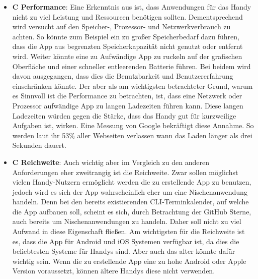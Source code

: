 \begin{itemize}
	\item \textbf{C Performance}: %
		Eine Erkenntnis aus  ist, dass Anwendungen für das Handy nicht zu viel Leistung und Ressourcen benötigen sollten. %
		Dementsprechend wird versucht auf den Speicher-, Prozessor- und Netzwerkverbrauch zu achten. %
			So könnte zum Beispiel ein zu großer Speicherbedarf dazu führen, dass die App aus begrenzten Speicherkapazität nicht genutzt oder entfernt wird. %
			Weiter könnte eine zu Aufwändige App zu ruckeln auf der grafischen Oberfläche und einer schneller entleerenden Batterie führen. Bei beidem wird davon ausgegangen, dass dies die Benutzbarkeit und Benutzererfahrung einschränken könnte. %
			Der aber als am wichtigsten betrachteter Grund, warum es Sinnvoll ist die Performance zu betrachten, ist, dass eine Netzwerk oder Prozessor aufwändige App zu langen Ladezeiten führen kann. %
				Diese langen Ladezeiten würden gegen die Stärke, dass das Handy gut für kurzweilige Aufgaben ist, wirken. %
				Eine Messung von Google bekräftigt diese Annahme. So werden laut ihr 53\% aller Webseiten verlassen wann das Laden länger als drei Sekunden dauert\cite{pcVsphone_threeSeconds}.
	
	\item \textbf{C Reichweite}: %
		Auch wichtig aber im Vergleich zu den anderen Anforderungen eher zweitrangig ist die Reichweite. %
			Zwar sollen möglichst vielen Handy-Nutzern ermöglicht werden die zu erstellende App zu benutzen, jedoch wird es sich der App wahrscheinlich eher um eine Nischenanwendung handeln. Denn bei den bereits existierenden CLI-Terminkalender, auf welche die App aufbauen soll, scheint es sich, durch Betrachtung der GitHub Sterne, auch bereits um Nischenanwendungen zu handeln\cite{cli_calcurseGitHub, cli_khal}. %
			Daher soll nicht zu viel Aufwand in diese Eigenschaft fließen.\newline%
		Am wichtigsten für die Reichweite ist es, dass die App für Android und iOS Systemen verfügbar ist, da dies die beliebtesten Systeme für Handys sind\cite{pcVsphone_mobileOperatingSystem}. %
		Aber auch das alter könnte dafür wichtig sein. Wenn die zu erstellende App eine zu hohe Android oder Apple Version voraussetzt, können ältere Handys diese nicht verwenden.




\end{itemize}
